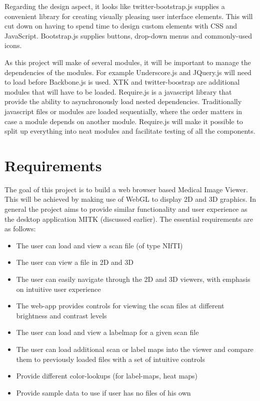 \documentclass[a4paper,11pt,titlepage]{article}
\begin{document}
Regarding the design aspect, it looks like twitter-bootstrap.js supplies a convenient library for creating visually pleasing user interface elements. This will cut down on having to spend time to design custom elements with CSS and JavaScript. Bootstrap.js supplies buttons, drop-down menus and commonly-used icons.

As this project will make of several modules, it will be important to manage the dependencies of the modules. For example Underscore.js and JQuery.js will need to load before Backbone.js is used. XTK and twitter-boostrap are additional modules that will have to be loaded. Require.js is a javascript library that provide the ability to asynchronously load nested dependencies. Traditionally javascript files or modules are loaded sequentially, where the order matters in case a module depends on another module. Require.js will make it possible to split up everything into neat modules and facilitate testing of all the components.




\section{Requirements}

The goal of this project is to build a web browser based Medical Image Viewer. This will be achieved by making use of WebGL to display 2D and 3D graphics. In general the project aims to provide similar functionality and user experience as the desktop application MITK (discussed earlier). The essential requirements are as follows:

\begin{itemize}
\item The user can load and view a scan file (of type NIfTI)
\item The user can view a file in 2D and 3D
\item The user can easily navigate through the 2D and 3D viewers, with emphasis on intuitive user experience
\item The web-app provides controls for viewing the scan files at different brightness and contrast levels
\item The user can load and view a labelmap for a given scan file
\item The user can load additional scan or label maps into the viewer and compare them to previously loaded files with a set of intuitive controls
\item Provide different color-lookups (for label-maps, heat maps)
\item Provide sample data to use if user has no files of his own
\end{itemize}
\end{document}
